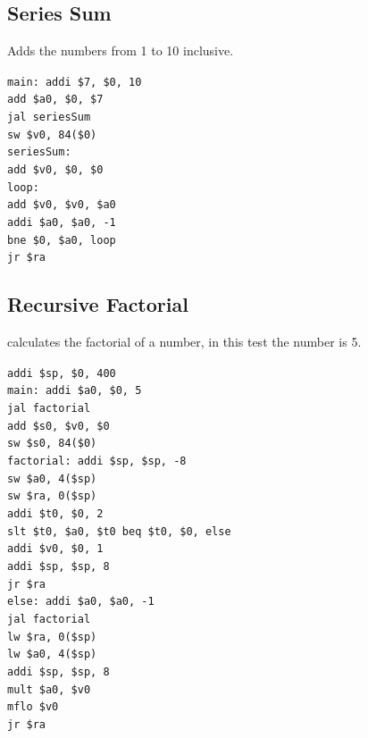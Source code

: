 \documentclass[titlepage,12pt,oneside,a4paper]{article}
\newcommand{\code}[1]{{\texttt{#1}}}
\begin{document}
\begin{multicols}{2}
\subsection{Series Sum}
Adds the numbers from 1 to 10 inclusive.

\code{main:
	addi \$7, \$0, 10 \\
	add \$a0, \$0, \$7\\
	jal seriesSum\\
	sw \$v0, 84(\$0)\\
	seriesSum:\\
	add \$v0, \$0, \$0\\
	loop:\\
	add \$v0, \$v0, \$a0\\
	addi \$a0, \$a0, -1\\
	bne \$0, \$a0, loop\\
	jr \$ra\\} 

\subsection{Recursive Factorial}
calculates the factorial of a number, in this test the number is 5.

\code{addi \$sp, \$0, 400 \\
	main:
	addi \$a0, \$0, 5\\
	jal factorial\\
	add \$s0, \$v0, \$0\\
	sw \$s0, 84(\$0)\\
	factorial: addi \$sp, \$sp, -8\\
	sw \$a0, 4(\$sp)\\
	sw \$ra, 0(\$sp)\\
	addi \$t0, \$0, 2\\
	slt \$t0, \$a0, \$t0
	beq \$t0, \$0, else\\
	addi \$v0, \$0, 1\\
	addi \$sp, \$sp, 8\\
	jr \$ra\\
	else: addi \$a0, \$a0, -1\\
	jal factorial\\
	lw \$ra, 0(\$sp)\\
	lw \$a0, 4(\$sp)\\
	addi \$sp, \$sp, 8\\
	mult \$a0, \$v0\\
	mflo \$v0\\
	jr \$ra\\}

\end{multicols}
\end{document}
